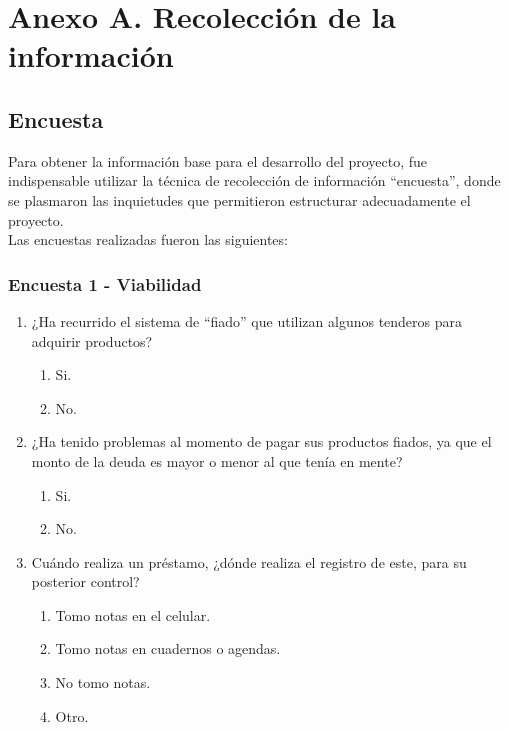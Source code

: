 \section*{Anexo A. Recolección de la información}

	\subsection*{Encuesta}
	
	{Para obtener la información base para el desarrollo del proyecto, fue indispensable utilizar la técnica de recolección de información “encuesta”, donde se plasmaron las inquietudes que permitieron estructurar adecuadamente el proyecto.\\
		
	Las encuestas realizadas fueron las siguientes:
	
	
		\subsubsection*{Encuesta 1 - Viabilidad}
		
			\begin{enumerate}
				
				\item ¿Ha recurrido el sistema de “fiado” que utilizan algunos tenderos para adquirir productos?
				
					\begin{enumerate}
						\item Si.
						\item No.
					\end{enumerate}
				
				\item ¿Ha tenido problemas al momento de pagar sus productos fiados, ya que el monto de la deuda es mayor o menor al que tenía en mente?
				
					\begin{enumerate}
						\item Si.
						\item No.
					\end{enumerate}	
				
				\item Cuándo realiza un préstamo, ¿dónde realiza el registro de este, para su posterior control?
					
					\begin{enumerate}
						\item Tomo notas en el celular.
						\item Tomo notas en cuadernos o agendas.
						\item No tomo notas.
						\item Otro.
					\end{enumerate}
				

\end{enumerate}}

